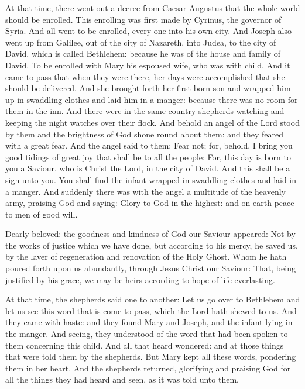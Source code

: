 At that time, there went out a decree from Caesar
Augustus that the whole world should be enrolled.  This enrolling was first
made by Cyrinus, the governor of Syria.  And all went to be enrolled, every one
into his own city.  And Joseph also went up from Galilee, out of the city of
Nazareth, into Judea, to the city of David, which is called Bethlehem: because
he was of the house and family of David.  To be enrolled with Mary his espoused
wife, who was with child.  And it came to pass that when they were there, her
days were accomplished that she should be delivered.  And she brought forth her
first born
son and wrapped him up in swaddling clothes and laid him in a manger: because
there was no room for them in the inn.  And there were in the same country
shepherds watching and keeping the night watches over their flock.  And behold
an angel of the Lord stood by them and the brightness of God shone round about
them: and they feared with a great fear.  And the angel said to them: Fear not;
for, behold, I bring you good tidings of great joy that shall be to all the
people: For, this day is born to you a Saviour, who is Christ the Lord, in the
city of David.  And this shall be a sign unto you. You shall find the infant
wrapped in swaddling clothes and laid in a manger.  And suddenly there was with
the angel a multitude of the heavenly army, praising God and saying: Glory to
God in the highest: and on earth peace to men of good will.

\bigskip




Dearly-beloved: the goodness and kindness of God our Saviour appeared: Not by the
works of justice which we have done, but according to his mercy, he saved us,
by the laver of regeneration and renovation of the Holy Ghost.  Whom he hath
poured forth upon us abundantly, through Jesus Christ our Saviour: That, being
justified by his grace, we may be heirs according to hope of life everlasting.



At that time, the
shepherds said one to another: Let us go over to Bethlehem and let us see this
word that is come to pass, which the Lord hath shewed to us.  And they came
with haste: and they found Mary and Joseph, and the infant lying in the manger.
And seeing, they understood of the word that had been spoken to them concerning
this child.  And all that heard wondered: and at those things that were told
them by the shepherds.  But Mary kept all these words, pondering them in her
heart.  And the shepherds returned, glorifying and praising God for all the
things they had heard and seen, as it was told unto them.


